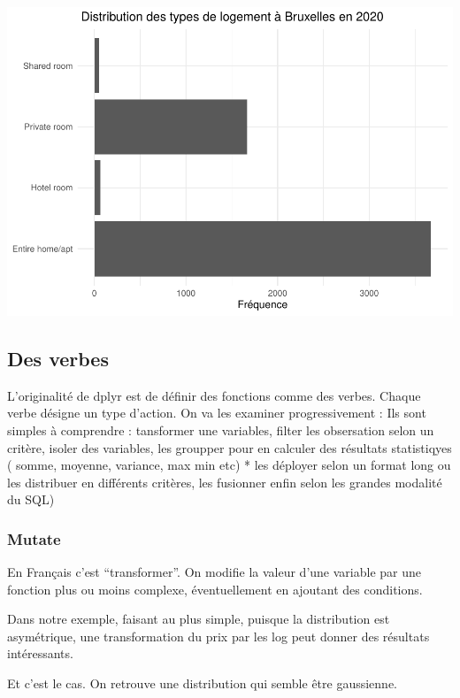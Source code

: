 \documentclass[
]{book}
\newenvironment{Shaded}{\begin{snugshade}}{\end{snugshade}}
\newcommand{\DataTypeTok}[1]{\textcolor[rgb]{0.13,0.29,0.53}{#1}}
\newcommand{\KeywordTok}[1]{\textcolor[rgb]{0.13,0.29,0.53}{\textbf{#1}}}
\newcommand{\NormalTok}[1]{#1}
\newcommand{\OperatorTok}[1]{\textcolor[rgb]{0.81,0.36,0.00}{\textbf{#1}}}
\newcommand{\StringTok}[1]{\textcolor[rgb]{0.31,0.60,0.02}{#1}}
\begin{document}
\includegraphics{bookdown-demo_files/figure-latex/0203-1.pdf}

\hypertarget{des-verbes}{%
\subsection{Des verbes}\label{des-verbes}}

L'originalité de dplyr est de définir des fonctions comme des verbes. Chaque verbe désigne un type d'action. On va les examiner progressivement :
Ils sont simples à comprendre : tansformer une variables, filter les obsersation selon un critère, isoler des variables, les groupper pour en calculer des résultats statistiqyes ( somme, moyenne, variance, max min etc) * les déployer selon un format long ou les distribuer en différents critères, les fusionner enfin selon les grandes modalité du SQL)

\hypertarget{mutate}{%
\subsubsection{Mutate}\label{mutate}}

En Français c'est ``transformer''. On modifie la valeur d'une variable par une fonction plus ou moins complexe, éventuellement en ajoutant des conditions.

Dans notre exemple, faisant au plus simple, puisque la distribution est asymétrique, une transformation du prix par les log peut donner des résultats intéressants.

Et c'est le cas. On retrouve une distribution qui semble être gaussienne.

\begin{Shaded}
\end{Shaded}
\end{document}
